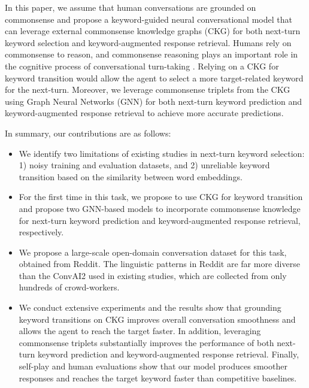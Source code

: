 \documentclass[letterpaper]{article} %
\begin{document}
In this paper, we assume that human conversations are grounded on commonsense and propose a keyword-guided neural conversational model that can leverage external commonsense knowledge graphs (CKG) for both next-turn keyword selection and keyword-augmented response retrieval. Humans rely on commonsense to reason, and commonsense reasoning plays an important role in the cognitive process of conversational turn-taking \cite{schegloff1991conversation, stocky2004commonsense, lieberman2004beating}. Relying on a CKG for keyword transition would allow the agent to select a more target-related keyword for the next-turn.
Moreover, we leverage commonsense triplets from the CKG using Graph Neural Networks (GNN) for both next-turn keyword prediction and keyword-augmented response retrieval to achieve more accurate predictions.

In summary, our contributions are as follows:
\begin{itemize}
\item We identify two limitations of existing studies in next-turn keyword selection: 1) noisy training and evaluation datasets, and 2) unreliable keyword transition based on the similarity between word embeddings.
\item For the first time in this task, we propose to use CKG for keyword transition and propose two GNN-based models to incorporate commonsense knowledge for next-turn keyword prediction and keyword-augmented response retrieval, respectively.
\item We propose a large-scale open-domain conversation dataset for this task, obtained from Reddit. The linguistic patterns in Reddit are far more diverse than the ConvAI2 \cite{zhang2018personalizing} used in existing studies, which are collected from only hundreds of crowd-workers.
\item We conduct extensive experiments and the results show that grounding keyword transitions on CKG improves overall conversation smoothness and allows the agent to reach the target faster. In addition, leveraging commonsense triplets substantially improves the performance of both next-turn keyword prediction and keyword-augmented response retrieval. Finally, self-play and human evaluations show that our model produces smoother responses and reaches the target keyword faster than competitive baselines.
\end{itemize}
\end{document}
